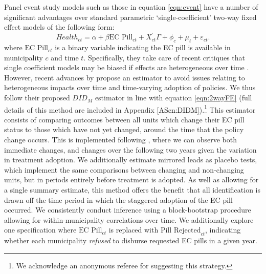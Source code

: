 \documentclass[12pt]{article}
\begin{document}
\begin{spacing}{1.9}
Panel event study models such as those in equation \ref{eqn:event} have a number of
significant advantages over standard parametric `single-coefficient' two-way fixed
effect models of the
following form:
\begin{equation}
  \label{eqn:2wayFE}
  Health_{ct} =\alpha +  \beta\text{EC Pill}_{ct} + X_{ct}^\prime\Gamma + \phi_c + \mu_t + \varepsilon_{ct}.
\end{equation}
where $\text{EC Pill}_{ct}$ is a binary variable indicating the EC pill is available in municipality $c$ and time $t$.  Specifically, they take care of recent critiques that single coefficient models may be biased if effects are heterogeneous over time \citep{GoodmanBacon2018}.  However, recent advances by \citet{ChaisemartinDH2019} propose an estimator to avoid issues relating to heterogeneous impacts over time and time-varying adoption of policies.  We thus follow their proposed $DID_M$ estimator in line with equation \ref{eqn:2wayFE} (full details of this method are included in Appendix \ref{AScn:DIDM}).\footnote{We acknowledge an anonymous referee for suggesting this strategy.}  This estimator consists of comparing outcomes between all units which change their EC pill status to those which have not yet changed, around the time that the policy change occurs.  This is implemented following \citet{dCDHG2019}, where we can observe both immediate changes, and changes over the following two years given the variation in treatment adoption.  We additionally estimate mirrored leads as placebo tests, which implement the same comparisons between changing and non-changing units, but in periods entirely before treatment is adopted.  As well as allowing for a single summary estimate, this method offers the benefit that all identification is drawn off the time period in which the staggered adoption of the EC pill occurred. We consistently conduct inference using a block-bootstrap procedure allowing for within-municipality correlations over time.  We additionally explore one specification where $\text{EC Pill}_{ct}$ is replaced with $\text{Pill Rejected}_{ct}$, indicating whether each municipality \emph{refused} to disburse requested EC pills in a given year.


\end{spacing}
\end{document}
